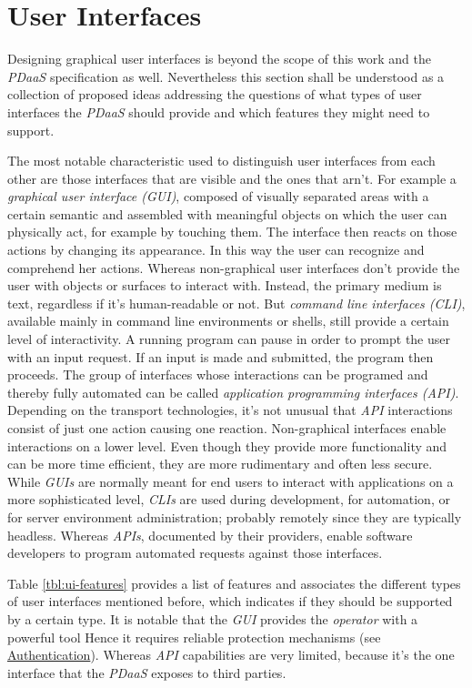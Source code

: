 \documentclass[12pt,english,a4paper,titlepage,cleardoublepage=empty,dottedtoc]{report}
\begin{document}
\section{User Interfaces}\label{user-interfaces}

Designing graphical user interfaces is beyond the scope of this work and
the \emph{PDaaS} specification as well. Nevertheless this section shall
be understood as a collection of proposed ideas addressing the questions
of what types of user interfaces the \emph{PDaaS} should provide and
which features they might need to support.

The most notable characteristic used to distinguish user interfaces from
each other are those interfaces that are visible and the ones that
arn't. For example a \emph{graphical user interface (GUI)}, composed of
visually separated areas with a certain semantic and assembled with
meaningful objects on which the user can physically act, for example by
touching them. The interface then reacts on those actions by changing
its appearance. In this way the user can recognize and comprehend her
actions. Whereas non-graphical user interfaces don't provide the user
with objects or surfaces to interact with. Instead, the primary medium
is text, regardless if it's human-readable or not. But \emph{command
line interfaces (CLI)}, available mainly in command line environments or
shells, still provide a certain level of interactivity. A running
program can pause in order to prompt the user with an input request. If
an input is made and submitted, the program then proceeds. The group of
interfaces whose interactions can be programed and thereby fully
automated can be called \emph{application programming interfaces (API)}.
Depending on the transport technologies, it's not unusual that
\emph{API} interactions consist of just one action causing one reaction.
Non-graphical interfaces enable interactions on a lower level. Even
though they provide more functionality and can be more time efficient,
they are more rudimentary and often less secure. While \emph{GUIs} are
normally meant for end users to interact with applications on a more
sophisticated level, \emph{CLIs} are used during development, for
automation, or for server environment administration; probably remotely
since they are typically headless. Whereas \emph{APIs}, documented by
their providers, enable software developers to program automated
requests against those interfaces.

Table \ref{tbl:ui-features} provides a list of features and associates
the different types of user interfaces mentioned before, which indicates
if they should be supported by a certain type. It is notable that the
\emph{GUI} provides the \emph{operator} with a powerful tool Hence it
requires reliable protection mechanisms (see
\protect\hyperlink{authentication}{Authentication}). Whereas \emph{API}
capabilities are very limited, because it's the one interface that the
\emph{PDaaS} exposes to third parties.
\end{document}
